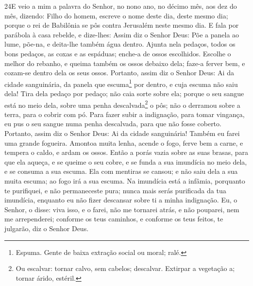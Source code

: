 \lettrine{24} E veio a mim a palavra do Senhor, no nono ano,
no décimo mês, aos dez do mês, dizendo: Filho do homem, escreve
o nome deste dia, deste mesmo dia; porque o rei de Babilônia se pôs
contra Jerusalém neste mesmo dia. E fala por parábola à casa
rebelde, e dize-lhes: Assim diz o Senhor Deus: Põe a panela ao lume,
põe-na, e deita-lhe também água dentro. Ajunta nela pedaços,
todos os bons pedaços, as coxas e as espáduas; enche-a de ossos
escolhidos. Escolhe o melhor do rebanho, e queima também os
ossos debaixo dela; faze-a ferver bem, e cozam-se dentro dela os
seus ossos. Portanto, assim diz o Senhor Deus: Ai da cidade
sanguinária, da panela que escuma\footnote{Espuma. Gente de baixa
extração social ou moral; ralé.} por dentro, e cuja escuma não saiu
dela! Tira dela pedaço por pedaço; não caia sorte sobre ela;
porque o seu sangue está no meio dela, sobre uma penha
descalvada\footnote{Ou escalvar: tornar calvo, sem cabelos;
descalvar. Extirpar a vegetação a; tornar árido, estéril.} o pôs;
não o derramou sobre a terra, para o cobrir com pó. Para fazer
subir a indignação, para tomar vingança, eu pus o seu sangue numa
penha descalvada, para que não fosse coberto. Portanto, assim
diz o Senhor Deus: Ai da cidade sanguinária! Também eu farei uma
grande fogueira. Amontoa muita lenha, acende o fogo, ferve
bem a carne, e tempera o caldo, e ardam os ossos. Então a
porás vazia sobre as suas brasas, para que ela aqueça, e se queime o
seu cobre, e se funda a sua imundícia no meio dela, e se consuma a
sua escuma. Ela com mentiras se cansou; e não saiu dela a sua
muita escuma; ao fogo irá a sua escuma. Na imundícia está a
infâmia, porquanto te purifiquei, e não permaneceste pura; nunca
mais serás purificada da tua imundícia, enquanto eu não fizer
descansar sobre ti a minha indignação. Eu, o Senhor, o disse:
viva isso, e o farei, não me tornarei atrás, e não pouparei, nem me
arrependerei; conforme os teus caminhos, e conforme os teus feitos,
te julgarão, diz o Senhor Deus.

